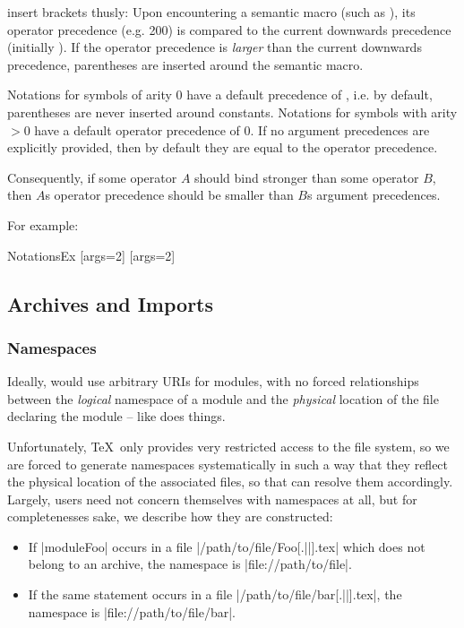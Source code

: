  \sTeX insert brackets thusly: Upon encountering a semantic
 macro (such as ), its operator precedence (e.g. 200)
 is compared to the current downwards precedence (initially 
 ). If the operator precedence is \emph{larger}
 than the current downwards precedence, parentheses are inserted
 around the semantic macro.

 Notations for symbols of arity 0 have a default precedence of ,
 i.e. by default, parentheses are never inserted around constants.
 Notations for symbols with arity $>0$ have a default operator
 precedence of $0$.
 If no argument precedences are explicitly provided, then by
 default they are equal to the operator precedence.

 Consequently, if some operator $A$ should bind stronger than
 some operator $B$, then $A$s operator precedence should be
 smaller than $B$s argument precedences.

 For example:
 \begin{smodule}{NotationsEx}
 [args=2]
 [args=2]


 \end{smodule}

 \subsection{Archives and Imports}

 \subsubsection{Namespaces}
   Ideally, \sTeX would use arbitrary URIs for modules, with no
   forced relationships between the \emph{logical} namespace
   of a module and the \emph{physical} location of the file
   declaring the module -- like \mmt does things.

   Unfortunately, \TeX\ only provides very restricted access to
   the file system, so we are forced to generate namespaces
   systematically in such a way that they reflect the physical
   location of the associated files, so that \sTeX can resolve
   them accordingly. Largely, users need not concern themselves
   with namespaces at all, but for completenesses sake, we describe
   how they are constructed:

   \begin{itemize}
     \item If |{module}{Foo}| occurs in a file
       |/path/to/file/Foo[.||].tex| which does not belong
       to an archive, the namespace is |file://path/to/file|.
     \item If the same statement occurs in a file
       |/path/to/file/bar[.||].tex|, the namespace is 
       |file://path/to/file/bar|.
   \end{itemize}

